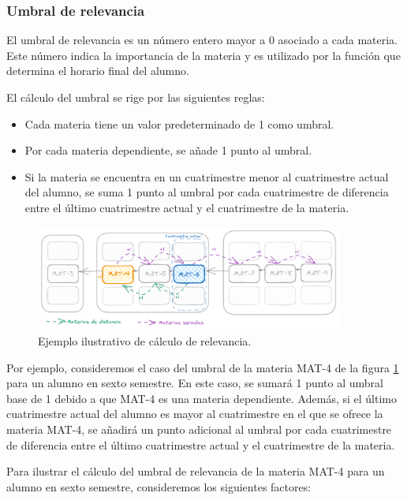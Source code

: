 \subsubsection{Umbral de relevancia}

El umbral de relevancia es un número entero mayor a 0 asociado a cada materia. Este número indica la importancia de la materia y es utilizado por la función que determina el horario final del alumno.

El cálculo del umbral se rige por las siguientes reglas:
\begin{itemize}
    \item Cada materia tiene un valor predeterminado de 1 como umbral.
    \item Por cada materia dependiente, se añade 1 punto al umbral.
    \item Si la materia se encuentra en un cuatrimestre menor al cuatrimestre actual del alumno, se suma 1 punto al umbral por cada cuatrimestre de diferencia entre el último cuatrimestre actual y el cuatrimestre de la materia.
\end{itemize}


\begin{figure}[h]
    \centering
    \includegraphics[width=0.9\textwidth]{images/AG-Simple-Serial-Umbral-Relevancia.png}
    \caption{Ejemplo ilustrativo de cálculo de relevancia.}
    \label{fig:ejemplo_ilustrativo_calculo_de_relevancia}
\end{figure}

Por ejemplo, consideremos el caso del umbral de la materia MAT-4 de la figura \ref{fig:ejemplo_ilustrativo_calculo_de_relevancia} para un alumno en sexto semestre. En este caso, se sumará 1 punto al umbral base de 1 debido a que MAT-4 es una materia dependiente. Además, si el último cuatrimestre actual del alumno es mayor al cuatrimestre en el que se ofrece la materia MAT-4, se añadirá un punto adicional al umbral por cada cuatrimestre de diferencia entre el último cuatrimestre actual y el cuatrimestre de la materia.

Para ilustrar el cálculo del umbral de relevancia de la materia MAT-4 para un alumno en sexto semestre, consideremos los siguientes factores:

